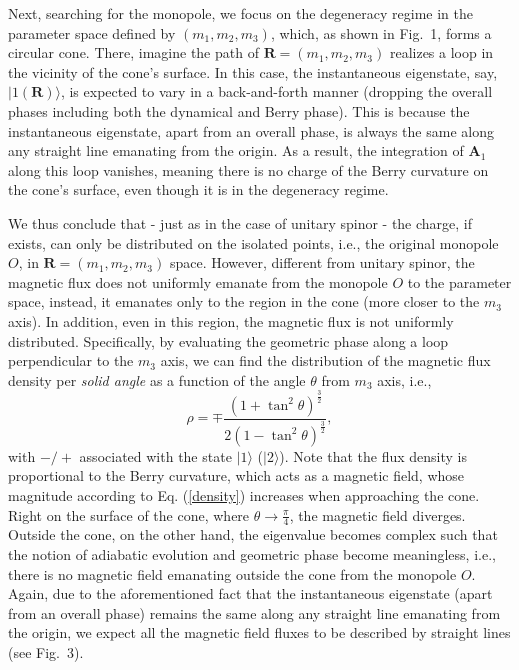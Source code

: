 \documentclass[pra,epsfig,rotate,superscriptaddress,showpacs]{revtex4}
\begin{document}
Next, searching for the monopole, we focus on the degeneracy regime in the parameter space defined by $(m_1,m_2,m_3)$, which, as shown in Fig.~1, forms a circular cone. There, imagine the path of $\mathbf{R}=(m_1,m_2,m_3)$ realizes a loop in the vicinity of the cone's surface. In this case, the instantaneous eigenstate, say, $|1(\mathbf{R})\rangle$, is expected to vary in a back-and-forth manner (dropping the overall phases including both the dynamical and Berry phase). This is because the instantaneous eigenstate, apart from an overall phase, is always the same along any straight line emanating from the origin. As a result, the integration of $\mathbf{A}_1$ along this loop vanishes, meaning there is no charge of the Berry curvature on the cone's surface, even though it is in the degeneracy regime.

We thus conclude that - just as in the case of unitary spinor - the charge, if exists, can only be distributed on the isolated points, i.e., the original monopole $O$, in $\mathbf{R}=(m_1,m_2,m_3)$ space. However, different from unitary spinor, the magnetic flux does not uniformly emanate from the monopole $O$ to the parameter space, instead, it emanates only to the region in the cone (more closer to the $m_3$ axis). In addition, even in this region, the magnetic flux is not uniformly distributed. Specifically, by evaluating the geometric phase along a loop perpendicular to the $m_3$ axis, we can find the distribution of the magnetic flux density per {\it solid angle} as a function of the angle $\theta$ from $m_3$ axis, i.e.,
\begin{equation} \label{density}
\rho=\mp \frac{(1+\tan^2\theta)^{\frac{3}{2}}}{2(1-\tan^2\theta)^{\frac{3}{2}}},
\end{equation}
with $-/+$ associated with the state $|1\rangle$ ($|2\rangle$). Note that the flux density is proportional to the Berry curvature, which acts as a magnetic field, whose magnitude according to Eq. (\ref{density}) increases when approaching the cone. Right on the surface of the cone, where $\theta\rightarrow\frac{\pi}{4}$, the magnetic field diverges. Outside the cone, on the other hand, the eigenvalue becomes complex such that the notion of adiabatic evolution and geometric phase become meaningless, i.e., there is no magnetic field emanating outside the cone from the monopole $O$. Again, due to the aforementioned fact that the instantaneous eigenstate (apart from an overall phase) remains the same along any straight line emanating from the origin, we expect all the magnetic field fluxes to be described by straight lines (see Fig.~3).
\end{document}
